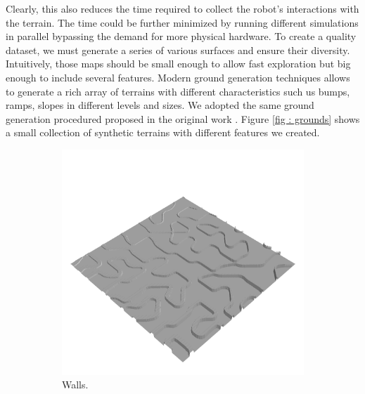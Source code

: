 \documentclass[../document.tex]{subfiles}
\begin{document}
Clearly, this also reduces the time required to collect the robot's interactions with the terrain. The time could be further minimized by running different simulations in parallel bypassing the demand for more physical hardware.
To create a quality dataset, we must generate a series of various surfaces and ensure their diversity.
Intuitively, those maps should be small enough to allow fast exploration but big enough to include several features. Modern ground generation techniques allows to generate a rich array of terrains with different characteristics such us bumps, ramps, slopes in different levels and sizes. We adopted the same ground generation procedured proposed in the original work \cite{omar2018traversability}. Figure \ref{fig : grounds} shows a small collection of synthetic terrains with different features we created.
\begin{figure}[htbp]
    \centering
    \begin{subfigure}[b]{0.24\textwidth}
        \includegraphics[width=\linewidth]{../img/hm3d/bars1.png}
        \caption{Walls.}
    \end{subfigure}
    \begin{subfigure}[b]{0.24\textwidth}

\end{subfigure}
\end{figure}
\end{document}
